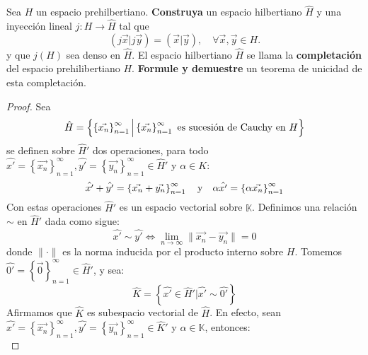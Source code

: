 \documentclass[12pt]{report}
\theoremstyle{largebreak}
\newcommand\cf[3]{\ensuremath{#1:#2\rightarrow#3}}
\newcommand\pint[2]{\ensuremath{\left(#1\big|#2\right)}}
\newcommand\norm[1]{\ensuremath{\|#1\|}}
\begin{document}
    \begin{excer}
        Sea $H$ un espacio prehilbertiano. \textbf{Construya} un espacio hilbertiano $\hat{H}$ y una inyección lineal $\cf{j}{H}{\hat{H}}$ tal que
        \begin{equation*}
            \pint{j\vec{x}}{j\vec{y}}=\pint{\vec{x}}{\vec{y}},\quad\forall\vec{x},\vec{y}\in H.
        \end{equation*}
        y que $j(H)$ sea denso en $\hat{H}$. El espacio hilbertiano $\hat{H}$ se llama la \textbf{completación} del espacio prehilibertiano $H$. \textbf{Formule y demuestre} un teorema de unicidad de esta completación.
    \end{excer}

    \begin{proof}
        Sea
        \begin{equation*}
            \hat{H}=\left\{\left\{\vec{x_n} \right\}_{n=1}^\infty\Big|\left\{\vec{x_n} \right\}_{n=1}^\infty\textup{ es sucesión de Cauchy en }H \right\}
        \end{equation*}
        se definen sobre $\hat{H}'$ dos operaciones, para todo $\hat{x'}=\left\{\vec{x_n} \right\}_{n=1}^\infty,\hat{y'}=\left\{\vec{y_n} \right\}_{n=1}^\infty\in \hat{H}'$ y $\alpha\in K$:
        \begin{equation*}
            \hat{x'}+\hat{y'}=\left\{\vec{x_n}+\vec{y_n} \right\}_{n=1 }^\infty\quad\textup{y}\quad\alpha\hat{x'}=\left\{\alpha\vec{x_n} \right\}_{n=1 }^\infty
        \end{equation*}
        Con estas operaciones $\hat{H}'$ es un espacio vectorial sobre $\mathbb{K}$. Definimos una relación $\sim$ en $\hat{H}'$ dada como sigue:
        \begin{equation*}
            \hat{x'}\sim\hat{y'}\iff\lim_{n\rightarrow\infty }\norm{\vec{x_n}-\vec{y_n}}=0
        \end{equation*}
        donde $\norm{\cdot}$ es la norma inducida por el producto interno sobre $H$. Tomemos $\hat{0'}=\left\{\vec{0} \right\}_{ n=1}^\infty\in\hat{H}'$, y sea:
        \begin{equation*}
            \hat{K}=\left\{\hat{x'}\in\hat{H}'\Big|\hat{x'}\sim\hat{0'} \right\}
        \end{equation*}
        Afirmamos que $\hat{K}$ es subespacio vectorial de $\hat{H}$. En efecto, sean $\hat{x'}=\left\{\vec{x_n} \right\}_{n=1}^\infty,\hat{y'}=\left\{\vec{y_n} \right\}_{n=1}^\infty\in \hat{K}'$ y $\alpha\in\mathbb{K}$, entonces:
        \begin{equation*}

\end{equation*}
\end{proof}
\end{document}
